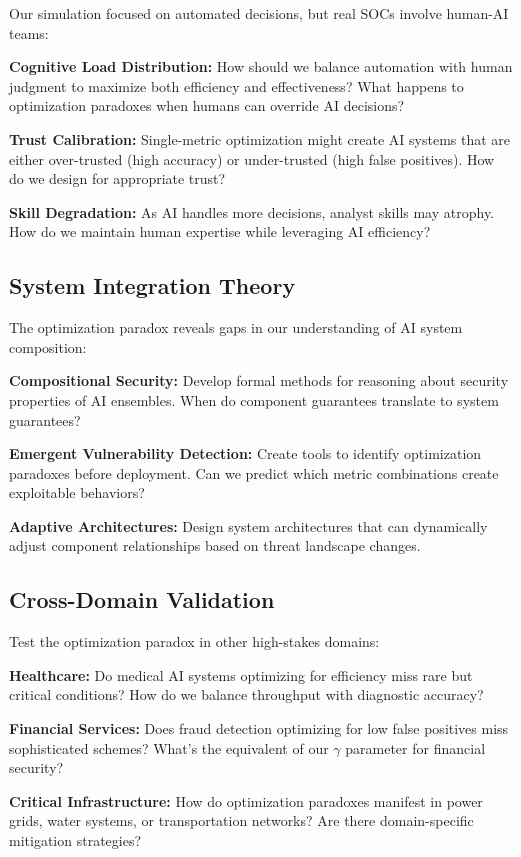 \documentclass[10pt,conference]{IEEEtran}
\begin{document}
Our simulation focused on automated decisions, but real SOCs involve human-AI teams:

\textbf{Cognitive Load Distribution:} How should we balance automation with human judgment to maximize both efficiency and effectiveness? What happens to optimization paradoxes when humans can override AI decisions?

\textbf{Trust Calibration:} Single-metric optimization might create AI systems that are either over-trusted (high accuracy) or under-trusted (high false positives). How do we design for appropriate trust?

\textbf{Skill Degradation:} As AI handles more decisions, analyst skills may atrophy. How do we maintain human expertise while leveraging AI efficiency?

\subsection{System Integration Theory}

The optimization paradox reveals gaps in our understanding of AI system composition:

\textbf{Compositional Security:} Develop formal methods for reasoning about security properties of AI ensembles. When do component guarantees translate to system guarantees?

\textbf{Emergent Vulnerability Detection:} Create tools to identify optimization paradoxes before deployment. Can we predict which metric combinations create exploitable behaviors?

\textbf{Adaptive Architectures:} Design system architectures that can dynamically adjust component relationships based on threat landscape changes.

\subsection{Cross-Domain Validation}

Test the optimization paradox in other high-stakes domains:

\textbf{Healthcare:} Do medical AI systems optimizing for efficiency miss rare but critical conditions? How do we balance throughput with diagnostic accuracy?

\textbf{Financial Services:} Does fraud detection optimizing for low false positives miss sophisticated schemes? What's the equivalent of our $\gamma$ parameter for financial security?

\textbf{Critical Infrastructure:} How do optimization paradoxes manifest in power grids, water systems, or transportation networks? Are there domain-specific mitigation strategies?
\end{document}
